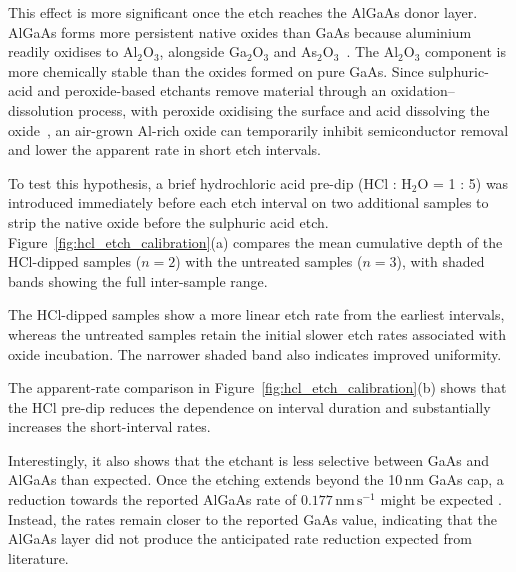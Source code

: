 \vspace{1mm}

This effect is more significant once the etch reaches the AlGaAs donor layer.
AlGaAs forms more persistent native oxides than GaAs because aluminium readily
oxidises to Al$_2$O$_3$, alongside Ga$_2$O$_3$ and
As$_2$O$_3$~\cite{Passlack,bessolov1998chalcogenide}. The Al$_2$O$_3$
component is more chemically stable than the oxides formed on pure GaAs. Since
sulphuric-acid and peroxide-based etchants remove material through an
oxidation--dissolution process, with peroxide oxidising the surface and acid
dissolving the oxide~\cite{notten1991mechanism}, an air-grown Al-rich oxide can
temporarily inhibit semiconductor removal and lower the apparent rate in short
etch intervals.

\vspace{1mm}

To test this hypothesis, a brief hydrochloric acid pre-dip
(HCl : H$_2$O = 1 : 5) was introduced immediately before each etch interval on
two additional samples to strip the native oxide before the sulphuric acid etch.
Figure~\ref{fig:hcl_etch_calibration}(a) compares the mean cumulative depth of
the HCl-dipped samples ($n = 2$) with the untreated samples ($n = 3$), with
shaded bands showing the full inter-sample range. 

\vspace{1mm}

The HCl-dipped samples show a more linear etch rate from the 
earliest intervals, whereas the untreated samples retain the initial 
slower etch rates associated with oxide incubation. 
The narrower shaded band also indicates improved uniformity.



The apparent-rate comparison in Figure~\ref{fig:hcl_etch_calibration}(b) shows
that the HCl pre-dip reduces the dependence on interval duration and
substantially increases the short-interval rates. 

\vspace{1mm}

Interestingly, it also shows that the etchant is less selective between GaAs 
and AlGaAs than expected. Once the etching extends beyond the 10\,nm GaAs cap, 
a reduction towards the reported AlGaAs rate of $0.177\,\mathrm{nm\,s}^{-1}$ might be expected
\cite{guan_etching}. Instead, the rates remain closer to the reported GaAs
value, indicating that the AlGaAs layer did not produce the anticipated rate
reduction expected from literature.  

